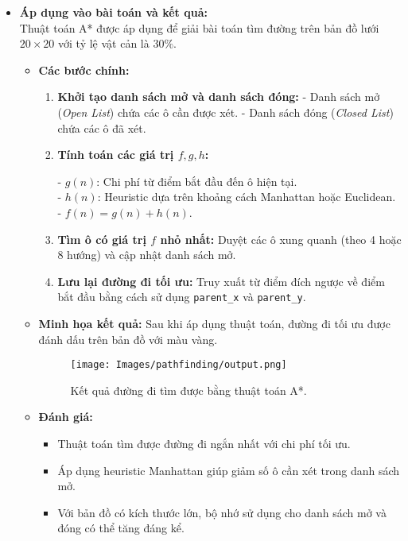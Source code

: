 \begin{itemize}
    \item \textbf{Áp dụng vào bài toán và kết quả:}\\
    Thuật toán A* được áp dụng để giải bài toán tìm đường trên bản đồ lưới \(20 \times 20\) với tỷ lệ vật cản là \(30\%\). 

    \begin{itemize}
        \item \textbf{Các bước chính:}
        \begin{enumerate}
            \item \textbf{Khởi tạo danh sách mở và danh sách đóng:} 
                  - Danh sách mở (\textit{Open List}) chứa các ô cần được xét.
                  - Danh sách đóng (\textit{Closed List}) chứa các ô đã xét.
            \item \textbf{Tính toán các giá trị \(f, g, h\):}
            
                  - \(g(n)\): Chi phí từ điểm bắt đầu đến ô hiện tại.\\
                  - \(h(n)\): Heuristic dựa trên khoảng cách Manhattan hoặc Euclidean.\\
                  - \(f(n) = g(n) + h(n)\).
            \item \textbf{Tìm ô có giá trị \(f\) nhỏ nhất:} 
                  Duyệt các ô xung quanh (theo 4 hoặc 8 hướng) và cập nhật danh sách mở.
            \item \textbf{Lưu lại đường đi tối ưu:} Truy xuất từ điểm đích ngược về điểm bắt đầu bằng cách sử dụng \texttt{parent\_x} và \texttt{parent\_y}.
        \end{enumerate}

        \item \textbf{Minh họa kết quả:}
        Sau khi áp dụng thuật toán, đường đi tối ưu được đánh dấu trên bản đồ với màu vàng.
        \begin{figure}[H]
            \centering
            \texttt{[image: Images/pathfinding/output.png]}
            \caption{Kết quả đường đi tìm được bằng thuật toán A*.}
            \label{fig:astar_result}
        \end{figure}

        \item \textbf{Đánh giá:}
        \begin{itemize}
            \item Thuật toán tìm được đường đi ngắn nhất với chi phí tối ưu.
            \item Áp dụng heuristic Manhattan giúp giảm số ô cần xét trong danh sách mở.
            \item Với bản đồ có kích thước lớn, bộ nhớ sử dụng cho danh sách mở và đóng có thể tăng đáng kể.
        \end{itemize}
    \end{itemize}
\end{itemize}

\newpage


